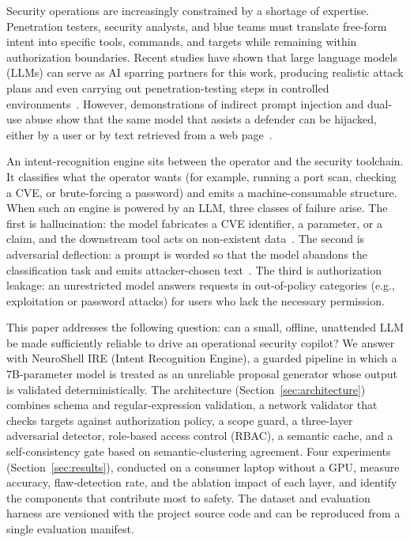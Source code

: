 \documentclass[a4paper,twoside]{article}
\begin{document}
\noindent Security operations are increasingly constrained by a shortage of expertise. Penetration testers, security analysts, and blue teams must translate free-form intent into specific tools, commands, and targets while remaining within authorization boundaries. Recent studies have shown that large language models (LLMs) can serve as AI sparring partners for this work, producing realistic attack plans and even carrying out penetration-testing steps in controlled environments~\cite{Happe23,Deng24}. However, demonstrations of indirect prompt injection and dual-use abuse show that the same model that assists a defender can be hijacked, either by a user or by text retrieved from a web page~\cite{Greshake23,Liu23,Kang24}.

An intent-recognition engine sits between the operator and the security toolchain. It classifies what the operator wants (for example, running a port scan, checking a CVE, or brute-forcing a password) and emits a machine-consumable structure. When such an engine is powered by an LLM, three classes of failure arise. The first is hallucination: the model fabricates a CVE identifier, a parameter, or a claim, and the downstream tool acts on non-existent data~\cite{Ji23,Farquhar24}. The second is adversarial deflection: a prompt is worded so that the model abandons the classification task and emits attacker-chosen text~\cite{Greshake23,Liu23}. The third is authorization leakage: an unrestricted model answers requests in out-of-policy categories (e.g., exploitation or password attacks) for users who lack the necessary permission.

This paper addresses the following question: can a small, offline, unattended LLM be made sufficiently reliable to drive an operational security copilot? We answer with NeuroShell IRE (Intent Recognition Engine), a guarded pipeline in which a 7B-parameter model is treated as an unreliable proposal generator whose output is validated deterministically. The architecture (Section~\ref{sec:architecture}) combines schema and regular-expression validation, a network validator that checks targets against authorization policy, a scope guard, a three-layer adversarial detector, role-based access control (RBAC), a semantic cache, and a self-consistency gate based on semantic-clustering agreement. Four experiments (Section~\ref{sec:results}), conducted on a consumer laptop without a GPU, measure accuracy, flaw-detection rate, and the ablation impact of each layer, and identify the components that contribute most to safety. The dataset and evaluation harness are versioned with the project source code and can be reproduced from a single evaluation manifest.
\end{document}
